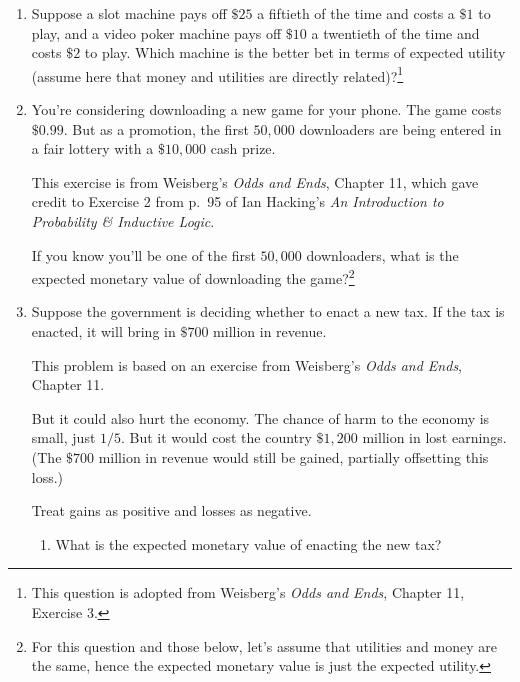 \documentclass[]{tufte-book}
\providecommand{\tightlist}{%
  \setlength{\itemsep}{0pt}\setlength{\parskip}{0pt}}
\begin{document}
\begin{enumerate}
\def\labelenumi{\arabic{enumi}.}
\item
  Suppose a slot machine pays off \(\$25\) a fiftieth of the time and costs a \(\$1\) to play, and a video poker machine pays off \(\$10\) a twentieth of the time and costs \(\$2\) to play. Which machine is the better bet in terms of expected utility (assume here that money and utilities are directly related)?\footnote{This question is adopted from Weisberg's \emph{Odds and Ends}, Chapter 11, Exercise 3.}
\item
  You're considering downloading a new game for your phone. The game costs \(\$0.99\). But as a promotion, the first \(50,000\) downloaders are being entered in a fair lottery with a \(\$10,000\) cash prize.

  \begin{marginfigure}
   This exercise is from Weisberg's \emph{Odds and Ends}, Chapter 11, which
   gave credit to Exercise 2 from p.~95 of Ian Hacking's \emph{An
   Introduction to Probability \& Inductive Logic}.
   \end{marginfigure}

  If you know you'll be one of the first \(50,000\) downloaders, what is the expected monetary value of downloading the game?\footnote{For this question and those below, let's assume that utilities and money are the same, hence the expected monetary value is just the expected utility.}
\item
  Suppose the government is deciding whether to enact a new tax. If the tax is enacted, it will bring in \(\$700\) million in revenue.

  \begin{marginfigure}
   This problem is based on an exercise from Weisberg's \emph{Odds and
   Ends}, Chapter 11.
   \end{marginfigure}

  But it could also hurt the economy. The chance of harm to the economy is small, just \(1/5\). But it would cost the country \(\$1,200\) million in lost earnings. (The \(\$700\) million in revenue would still be gained, partially offsetting this loss.)

  Treat gains as positive and losses as negative.

  \begin{enumerate}
  \def\labelenumii{\alph{enumii}.}
  \tightlist
  \item
    What is the expected monetary value of enacting the new tax?
  \end{enumerate}


\end{enumerate}
\end{document}
